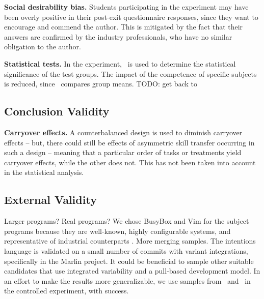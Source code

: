 \textbf{Social desirability bias.} Students participating in the experiment may have been overly positive in their post-exit questionnaire responses, since they want to encourage and commend the author. This is mitigated by the fact that their answers are confirmed by the industry professionals, who have no similar obligation to the author.

\textbf{Statistical tests.} In the experiment, \anova~is used to determine the statistical significance of the test groups. The impact of the competence of specific subjects is reduced, since \anova~compares group means. TODO: get back to

\subsection{Conclusion Validity}

\textbf{Carryover effects.} A counterbalanced design is used to diminish carryover effects -- but, there could still be effects of asymmetric skill transfer occurring in such a design -- meaning that a particular order of tasks or treatments yield carryover effects, while the other does not. This has not been taken into account in the statistical analysis.

\subsection{External Validity}
Larger programs?
Real programs?
We chose BusyBox and Vim for the subject programs because they are well-known, highly configurable systems, and representative of industrial counterparts \cite{hunsen2016}.
More merging samples. The intentions language is validated on a small number of commits with variant integrations, specifically in the Marlin project. It could be beneficial to sample other suitable candidates that use integrated variability and a pull-based development model. In an effort to make the results more generalizable, we use samples from \vim~and \busybox~in the controlled experiment, with success.

